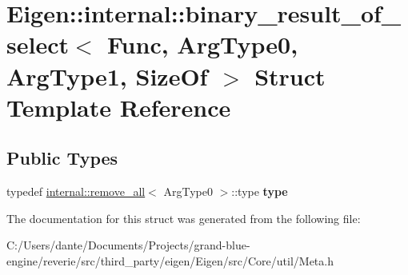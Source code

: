 \hypertarget{struct_eigen_1_1internal_1_1binary__result__of__select}{}\section{Eigen\+::internal\+::binary\+\_\+result\+\_\+of\+\_\+select$<$ Func, Arg\+Type0, Arg\+Type1, Size\+Of $>$ Struct Template Reference}
\label{struct_eigen_1_1internal_1_1binary__result__of__select}
\subsection*{Public Types}
\begin{DoxyCompactItemize}
\item 
\mbox{\label{struct_eigen_1_1internal_1_1binary__result__of__select_af0d2f7a6263e74d1ee937e9e182fe553}} 
typedef \mbox{\hyperlink{struct_eigen_1_1internal_1_1remove__all}{internal\+::remove\+\_\+all}}$<$ Arg\+Type0 $>$\+::type {\bfseries type}
\end{DoxyCompactItemize}


The documentation for this struct was generated from the following file\+:\begin{DoxyCompactItemize}
\item 
C\+:/\+Users/dante/\+Documents/\+Projects/grand-\/blue-\/engine/reverie/src/third\+\_\+party/eigen/\+Eigen/src/\+Core/util/Meta.\+h\end{DoxyCompactItemize}
